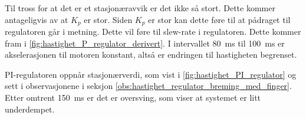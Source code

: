 Til tross for at det er et stasjonæravvik er det ikke så stort. Dette kommer antageligvis av at $K_p$ er stor. Siden $K_p$ er stor kan dette føre til at pådraget til regulatoren går i metning. Dette vil føre til slew-rate i regulatoren. Dette kommer fram i \autoref{fig:hastighet_P_regulator_derivert}. I intervallet \SI{80}{\milli\second} til \SI{100}{\milli\second} er akselerasjonen til motoren konstant, altså er endringen til hastigheten begrenset.

PI-regulatoren oppnår stasjonærverdi, som vist i \autoref{fig:hastighet_PI_regulator} og sett i observasjonene i seksjon \ref{obs:hastighet_regulator_breming_med_finger}. Etter omtrent \SI{150}{\milli\second} er det er oversving, som viser at systemet er litt underdempet. 

